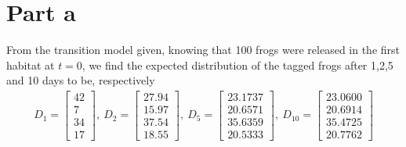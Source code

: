 \section{Part a}
From the transition model given, knowing that 100 frogs were released in the first habitat at $t=0$, we find the expected distribution of the tagged frogs after 1,2,5 and 10 days to be, respectively
\begin{align*}                                     \textbf{$D_{1}$} = \begin{bmatrix} 
42\\
7 \\
34 \\
17
\end{bmatrix},\
\textbf{$D_{2}$} = \begin{bmatrix}
27.94 \\
15.97 \\
37.54 \\
18.55
\end{bmatrix},\
\textbf{$D_{5}$} = \begin{bmatrix}
23.1737 \\
20.6571 \\
35.6359 \\
20.5333
\end{bmatrix},\
\textbf{$D_{10}$} = \begin{bmatrix}
23.0600 \\
20.6914\\
35.4725\\
20.7762
\end{bmatrix}
\end{align*}

